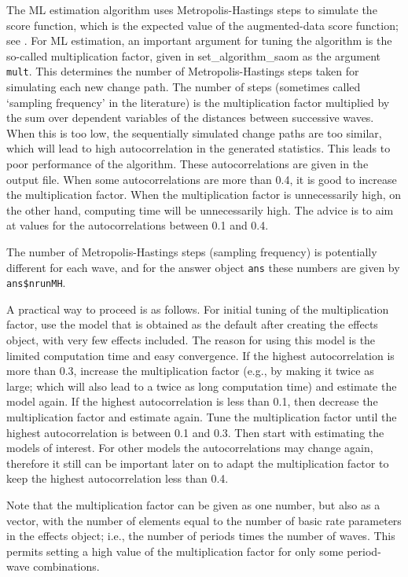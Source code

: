 \documentclass[a4paper,fleqn,11pt]{article}
\newcommand{\+}{\, + \,}
\newcommand{\sfn}[1]{\textsf{#1}}
\begin{document}
The ML estimation algorithm uses Metropolis-Hastings steps
to simulate the score function, which is the expected value
of the augmented-data score function;
see \citet{SnijdersEA10a}.
For ML estimation, an important argument for tuning the
algorithm is the so-called \textsf{multiplication factor},
given in \sfn{set\_algorithm\_saom} as the argument \texttt{mult}.
This determines the number of Metropolis-Hastings steps taken
for simulating each new change path.
The number of steps (sometimes called `sampling frequency' in the literature)
is the multiplication factor multiplied by the sum over dependent variables
of the distances between successive waves.
When this is too low, the
sequentially simulated change paths are too similar, which will
lead to high autocorrelation in the generated statistics.
This leads to poor performance of the algorithm.
These autocorrelations are given in the output file. When some
autocorrelations are more than 0.4, it is good to increase the
\textsf{multiplication factor}.
When the \textsf{multiplication factor} is unnecessarily high,
on the other hand, computing time will be unnecessarily high.
The advice is to aim at values for the autocorrelations
between 0.1 and 0.4.

The number of Metropolis-Hastings steps (sampling frequency)
is potentially different for each wave,
and for the answer object \texttt{ans} these numbers are
given by \texttt{ans\$nrunMH}.

A practical way to proceed is as follows.
For initial tuning of the multiplication factor, use the model that
is obtained as the default after creating the effects object,
with very few effects included. The reason for using this model
is the limited computation time and easy convergence.
If the highest autocorrelation is more than 0.3, increase the
multiplication factor (e.g., by making it twice as large;
which will also lead to a twice as long computation time)
and estimate the model again.
If the highest autocorrelation is less than 0.1, then decrease
the multiplication factor and estimate again.
Tune the multiplication factor until the highest autocorrelation
is between 0.1 and 0.3.
Then start with estimating the models of interest.
For other models the autocorrelations may change again, therefore
it still can be important later on to adapt the multiplication factor
to keep the highest autocorrelation less than 0.4.

Note that the multiplication factor can be given as one number,
but also as a vector, with the number of elements equal to the number of
basic rate parameters in the effects object; i.e., the number
of periods times the number of waves. This permits setting a high
value of the multiplication factor for only some period-wave combinations.
\end{document}
